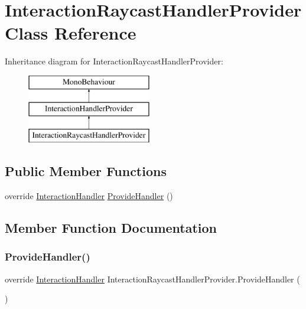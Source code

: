 \hypertarget{class_interaction_raycast_handler_provider}{}\section{Interaction\+Raycast\+Handler\+Provider Class Reference}
\label{class_interaction_raycast_handler_provider}
Inheritance diagram for Interaction\+Raycast\+Handler\+Provider\+:\begin{figure}[H]
\begin{center}
\leavevmode
\includegraphics[height=3.000000cm]{class_interaction_raycast_handler_provider}
\end{center}
\end{figure}
\subsection*{Public Member Functions}
\begin{DoxyCompactItemize}
\item 
override \mbox{\hyperlink{class_interaction_handler}{Interaction\+Handler}} \mbox{\hyperlink{class_interaction_raycast_handler_provider_a28dd638d43f03de5601347fd39cb6211}{Provide\+Handler}} ()
\end{DoxyCompactItemize}


\subsection{Member Function Documentation}
\mbox{\label{class_interaction_raycast_handler_provider_a28dd638d43f03de5601347fd39cb6211}} 
\subsubsection{\texorpdfstring{Provide\+Handler()}{ProvideHandler()}}
{\footnotesize\ttfamily override \mbox{\hyperlink{class_interaction_handler}{Interaction\+Handler}} Interaction\+Raycast\+Handler\+Provider.\+Provide\+Handler (\begin{DoxyParamCaption}{ }\end{DoxyParamCaption})\hspace{0.3cm}{\ttfamily [virtual]}}



